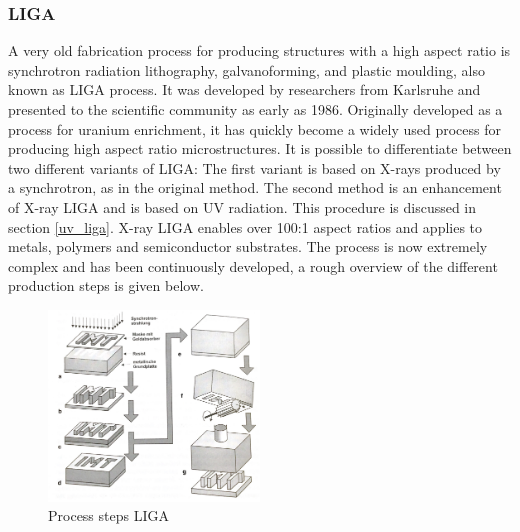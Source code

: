 \documentclass[a4paper,
  twoside, %
  headlines=2.1 %
  ]{scrartcl}
\begin{document}
\subsubsection{LIGA}
A very old fabrication process for producing structures with a high aspect ratio is synchrotron radiation lithography, galvanoforming, and plastic moulding, also known as LIGA process. It was developed by researchers from Karlsruhe and presented to the scientific community as early as 1986. \cite{BECKER198635} Originally developed as a process for uranium enrichment, it has quickly become a widely used process for producing high aspect ratio microstructures. It is possible to differentiate between two different variants of LIGA: The first variant is based on X-rays produced by a synchrotron, as in the original method. The second method is an enhancement of X-ray LIGA and is based on UV radiation. This procedure is discussed in section \ref{uv_liga}. X-ray LIGA enables over 100:1 aspect ratios and applies to metals, polymers and semiconductor substrates. The process is now extremely complex and has been continuously developed, a rough overview of the different production steps is given below.
\begin{figure}[H]
	\centering
	\includegraphics[width=0.5\textwidth]{Graphics/Liga/LIGA.pdf}
	\caption{Process steps LIGA\cite{menz2005paul}}
	\centering
	\label{Schematic_LIGA}
\end{figure} 
\end{document}
